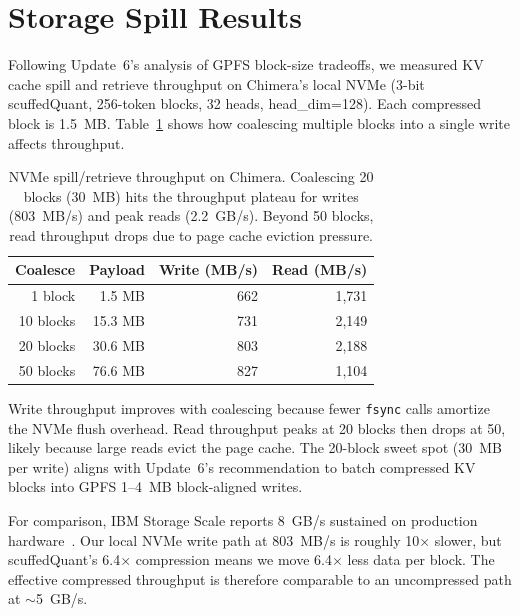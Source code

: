 \documentclass[11pt,letterpaper]{article}
\begin{document}
\section{Storage Spill Results}
\label{sec:storage_spill}

Following Update~6's analysis of GPFS block-size tradeoffs, we measured KV cache spill and retrieve throughput on Chimera's local NVMe (3-bit scuffedQuant, 256-token blocks, 32 heads, head\_dim=128). Each compressed block is 1.5~MB. Table~\ref{tab:storage_spill} shows how coalescing multiple blocks into a single write affects throughput.

\begin{table}[ht]
\centering\small
\begin{tabular}{rrrr}
\toprule
\textbf{Coalesce} & \textbf{Payload} & \textbf{Write (MB/s)} & \textbf{Read (MB/s)} \\
\midrule
1 block & 1.5 MB & 662 & 1,731 \\
10 blocks & 15.3 MB & 731 & 2,149 \\
20 blocks & 30.6 MB & 803 & 2,188 \\
50 blocks & 76.6 MB & 827 & 1,104 \\
\bottomrule
\end{tabular}
\caption{NVMe spill/retrieve throughput on Chimera. Coalescing 20 blocks (30~MB) hits the throughput plateau for writes (803~MB/s) and peak reads (2.2~GB/s). Beyond 50 blocks, read throughput drops due to page cache eviction pressure.}
\label{tab:storage_spill}
\end{table}

Write throughput improves with coalescing because fewer \texttt{fsync} calls amortize the NVMe flush overhead. Read throughput peaks at 20 blocks then drops at 50, likely because large reads evict the page cache. The 20-block sweet spot (30~MB per write) aligns with Update~6's recommendation to batch compressed KV blocks into GPFS 1--4~MB block-aligned writes.

For comparison, IBM Storage Scale reports 8~GB/s sustained on production hardware~\cite{hsu2026kv}. Our local NVMe write path at 803~MB/s is roughly 10$\times$ slower, but scuffedQuant's 6.4$\times$ compression means we move 6.4$\times$ less data per block. The effective compressed throughput is therefore comparable to an uncompressed path at $\sim$5~GB/s.

\end{document}
